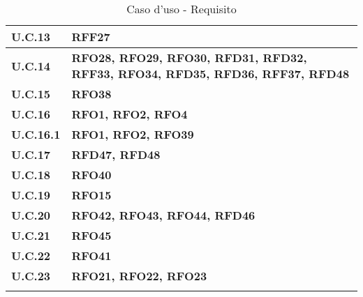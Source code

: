\begin{longtable}{|>{\centering\arraybackslash}m{}|>{\centering\arraybackslash}m{}|}
	\textbf{U.C.13} & \textbf{RFF27} \\\hline
	\textbf{U.C.14} & \textbf{RFO28, RFO29, RFO30, RFD31, RFD32, RFF33, RFO34, RFD35, RFD36, RFF37, RFD48} \\\hline
	\textbf{U.C.15} & \textbf{RFO38} \\\hline
	\textbf{U.C.16} & \textbf{RFO1, RFO2, RFO4} \\\hline
	\textbf{U.C.16.1} & \textbf{RFO1, RFO2, RFO39} \\\hline
	\textbf{U.C.17} & \textbf{RFD47, RFD48} \\\hline
	\textbf{U.C.18} & \textbf{RFO40} \\\hline
	\textbf{U.C.19} & \textbf{RFO15} \\\hline
	\textbf{U.C.20} & \textbf{RFO42, RFO43, RFO44, RFD46} \\\hline
	\textbf{U.C.21} & \textbf{RFO45} \\\hline
	\textbf{U.C.22} & \textbf{RFO41} \\\hline
	\textbf{U.C.23} & \textbf{RFO21, RFO22, RFO23} \\\hline
	\caption{Caso d'uso - Requisito}
\end{longtable}